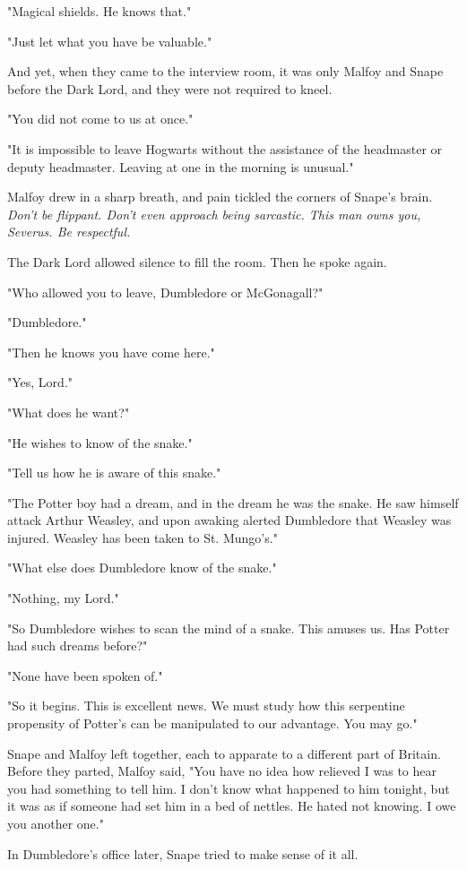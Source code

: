 \documentclass[a4paper,11pt]{article}
\begin{document}
"Magical shields. He knows that."

"Just let what you have be valuable."

And yet, when they came to the interview room, it was only Malfoy and Snape before the Dark Lord, and they were not required to kneel.

"You did not come to us at once."

"It is impossible to leave Hogwarts without the assistance of the headmaster or deputy headmaster. Leaving at one in the morning is unusual."

Malfoy drew in a sharp breath, and pain tickled the corners of Snape's brain. \emph{Don't be flippant. Don't even approach being sarcastic. This man owns you, Severus. Be respectful.}

The Dark Lord allowed silence to fill the room. Then he spoke again.

"Who allowed you to leave, Dumbledore or McGonagall?"

"Dumbledore."

"Then he knows you have come here."

"Yes, Lord."

"What does he want?"

"He wishes to know of the snake."

"Tell us how he is aware of this snake."

"The Potter boy had a dream, and in the dream he was the snake. He saw himself attack Arthur Weasley, and upon awaking alerted Dumbledore that Weasley was injured. Weasley has been taken to St. Mungo's."

"What else does Dumbledore know of the snake."

"Nothing, my Lord."

"So Dumbledore wishes to scan the mind of a snake. This amuses us. Has Potter had such dreams before?"

"None have been spoken of."

"So it begins. This is excellent news. We must study how this serpentine propensity of Potter's can be manipulated to our advantage. You may go."

Snape and Malfoy left together, each to apparate to a different part of Britain. Before they parted, Malfoy said, "You have no idea how relieved I was to hear you had something to tell him. I don't know what happened to him tonight, but it was as if someone had set him in a bed of nettles. He hated not knowing. I owe you another one."

In Dumbledore's office later, Snape tried to make sense of it all.
\end{document}
